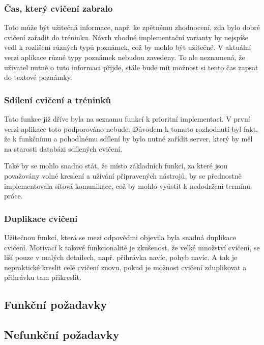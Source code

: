 \documentclass[thesis=B,czech]{FITthesis}[2012/06/26]
\begin{document}
\subsubsection{Čas, který cvičení zabralo}

	Toto může být užitečná informace, např. ke zpětnému zhodnocení, zda bylo dobré cvičení zařadit do tréninku. Návrh vhodné implementační varianty by nejspíše vedl k rozlišení různých typů poznámek, což by mohlo být užitečné. V aktuální verzi aplikace různé typy poznámek nebudou zavedeny. To ale neznamená, že uživatel nutně o tuto informaci přijde, stále bude mít možnost si tento čas zapsat do textové poznámky.

\subsubsection{Sdílení cvičení a tréninků}

	Tato funkce již dříve byla na seznamu funkcí k prioritní implementaci. V první verzi aplikace toto podporováno nebude. Důvodem k tomuto rozhodnutí byl fakt, že k funkčnímu a pohodlnému sdílení by bylo nutné zařídit server, který by měl na starosti databázi sdílených cvičení.

	Také by se mohlo snadno stát, že místo základních funkcí, za které jsou považovány volné kreslení a užívání připravených nástrojů, by se přednostně implementovala síťová komunikace, což by mohlo vyústit k nedodržení termínu práce.

\subsubsection{Duplikace cvičení}

	Užitečnou funkcí, která se mezi odpověďmi objevila byla snadná duplikace cvičení. Motivací k takové funkcionalitě je zkušenost, že velké množství cvičení, se liší pouze v malých detailech, např. přihrávka navíc, pohyb navíc. A tak je nepraktické kreslit celé cvičení znovu, pokud je možnost cvičení zduplikovat a přihrávku tam přikreslit.



\subsection{Funkční požadavky}

\subsection{Nefunkční požadavky}
\end{document}

